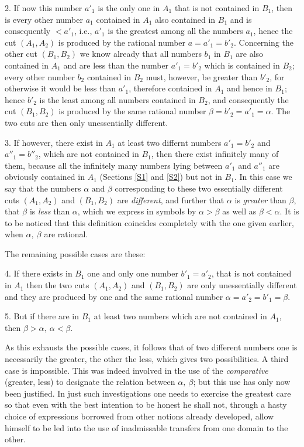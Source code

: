 \documentclass[oneside,12pt]{book}
\begin{document}
2. If now this number $a'_1$ is the only one in $A_1$ that is not contained in $B_1$, then is every other number $a_1$ contained in $A_1$ also contained in $B_1$ and is consequently $<a'_1$, i.e., $a'_1$ is the greatest among all the numbers $a_1$, hence the cut $(A_1,A_2)$ is produced by the rational number $a=a'_1=b'_2$. Concerning the other cut $(B_1,B_2)$ we know already that all numbers $b_1$ in $B_1$ are also contained in $A_1$ and are less than the number $a'_1=b'_2$ which is contained in $B_2$; every other number $b_2$ contained in $B_2$ must, however, be greater than $b'_2$, for otherwise it would be less than $a'_1$, therefore contained in $A_1$ and hence in $B_1$; hence $b'_2$ is the least among all numbers contained in $B_2$, and consequently the cut $(B_1,B_2)$ is produced by the same rational number $\beta =b'_2=a'_1=\alpha$. The two cuts are then only unessentially different. \par 

3. If however, there exist in $A_1$ at least two differnt numbers $a'_1=b'_2$ and $a''_1=b''_2$, which are not contained in $B_1$, then there exist infinitely many of them, because all the infinitely many numbers lying between $a'_1$ and $a''_1$ are obviously contained in $A_1$ (Sections \ref{S1} and \ref{S2}) but not in $B_1$. In this case we say that the numbers $\alpha \text{ and } \beta$ corresponding to these two essentially different cuts $(A_1,A_2)$ and $(B_1,B_2)$ are \textit{different}, and further that $\alpha$ is \textit{greater} than $\beta$, that $\beta$ is \textit{less} than $\alpha$, which we express in symbols by $\alpha > \beta$ as well as $\beta < \alpha$. It is to be noticed that this definition coincides completely with the one given earlier, when $\alpha,\ \beta$ are rational. \par 

The remaining possible cases are these: \par 

4. If there exists in $B_1$ one and only one number $b'_1=a'_2$, that is not contained in $A_1$ then the two cuts $(A_1,A_2)$ and $(B_1,B_2)$ are only unessentially different and they are produced by one and the same rational number $\alpha = a'_2=b'_1= \beta$. \par 

5. But if there are in $B_1$ at least two numbers which are not contained in $A_1$, then $\beta > \alpha,\ \alpha < \beta$. \par 

As this exhausts the possible cases, it follows that of two different numbers one is necessarily the greater, the other the less, which gives two possibilities. A third case is impossible. This was indeed involved in the use of the \textit{comparative} (greater, less) to designate the relation between $\alpha,\ \beta$; but this use has only now been justified. In just such investigations one needs to exercise the greatest care so that even with the best intention to be honest he shall not, through a hasty choice of expressions borrowed from other notions already developed, allow himself to be led into the use of inadmissable transfers from one domain to the other. \par 
\end{document}
